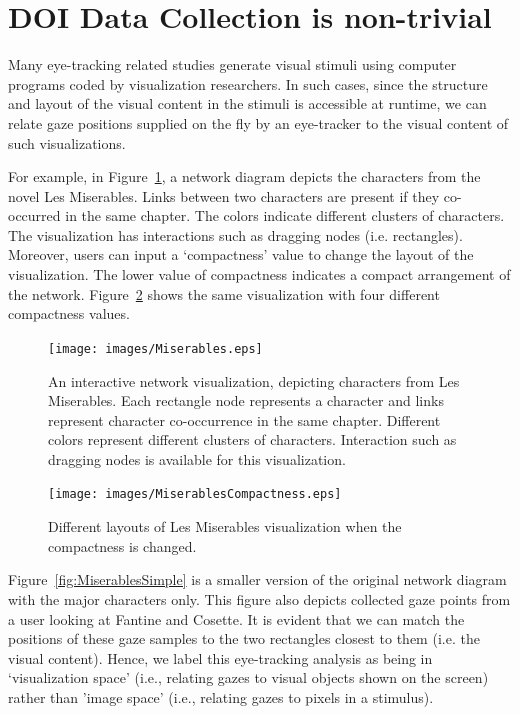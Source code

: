 


\section{DOI Data Collection is non-trivial}
\label{sec:DOINonTrivial}
Many eye-tracking related studies generate visual stimuli using computer programs coded by visualization researchers. In such cases, since the structure and layout of the visual content in the stimuli is accessible at runtime, we can relate gaze positions supplied on the fly by an eye-tracker to the visual content of such visualizations.

For example, in Figure~\ref{fig:Miserables}, a network diagram depicts the characters from the novel Les Miserables. Links between two characters are present if they co-occurred in the same chapter. The colors indicate different clusters of characters. The visualization has interactions such as dragging nodes (i.e. rectangles). Moreover, users can input a `compactness' value to change the layout of the visualization. The lower value of compactness indicates a compact arrangement of the network. Figure~\ref{fig:MiserablesCompactness} shows the same visualization with four different compactness values. 


\begin{figure}[htb]
  \centering
  \texttt{[image: images/Miserables.eps]}
  \caption{An interactive network visualization, depicting characters from Les Miserables. Each rectangle node represents a character and links represent character co-occurrence in the same chapter. Different colors represent different clusters of characters. Interaction such as dragging nodes is available for this visualization.}
    \label{fig:Miserables}
\end{figure}

\begin{figure}[htb]
  \centering
  \texttt{[image: images/MiserablesCompactness.eps]}
  \caption{Different layouts of Les Miserables visualization when the compactness is changed.}
    \label{fig:MiserablesCompactness}
\end{figure}

Figure~\ref{fig:MiserablesSimple} is a smaller version of the original network diagram with the major characters only. This figure also depicts collected gaze points from a user looking at Fantine and Cosette. It is evident that we can match the positions of these gaze samples to the two rectangles closest to them (i.e. the visual content). Hence, we label this eye-tracking analysis as being in `visualization space' (i.e., relating gazes to visual objects shown on the screen) rather than 'image space' (i.e., relating gazes to pixels in a stimulus).

